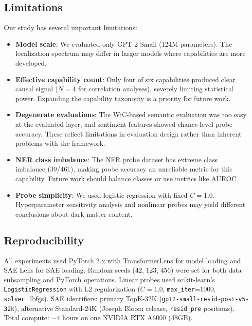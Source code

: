 \documentclass{article}
\begin{document}
\subsection{Limitations}

Our study has several important limitations:

\begin{itemize}
    \item \textbf{Model scale}: We evaluated only GPT-2 Small (124M parameters). The localization spectrum may differ in larger models where capabilities are more developed.
    \item \textbf{Effective capability count}: Only four of six capabilities produced clear causal signal ($N = 4$ for correlation analyses), severely limiting statistical power. Expanding the capability taxonomy is a priority for future work.
    \item \textbf{Degenerate evaluations}: The WiC-based semantic evaluation was too easy at the evaluated layer, and sentiment features showed chance-level probe accuracy. These reflect limitations in evaluation design rather than inherent problems with the framework.
    \item \textbf{NER class imbalance}: The NER probe dataset has extreme class imbalance (39/461), making probe accuracy an unreliable metric for this capability. Future work should balance classes or use metrics like AUROC.
    \item \textbf{Probe simplicity}: We used logistic regression with fixed $C = 1.0$. Hyperparameter sensitivity analysis and nonlinear probes may yield different conclusions about dark matter content.
\end{itemize}

\subsection{Reproducibility}

All experiments used PyTorch 2.x with TransformerLens for model loading and SAE Lens for SAE loading. Random seeds (42, 123, 456) were set for both data subsampling and PyTorch operations. Linear probes used scikit-learn's \texttt{LogisticRegression} with L2 regularization ($C = 1.0$, \texttt{max\_iter}=1000, \texttt{solver}=lbfgs). SAE identifiers: primary TopK-32K (\texttt{gpt2-small-resid-post-v5-32k}), alternative Standard-24K (Joseph Bloom release, \texttt{resid\_pre} positions). Total compute: $\sim$4 hours on one NVIDIA RTX A6000 (48GB).
\end{document}
